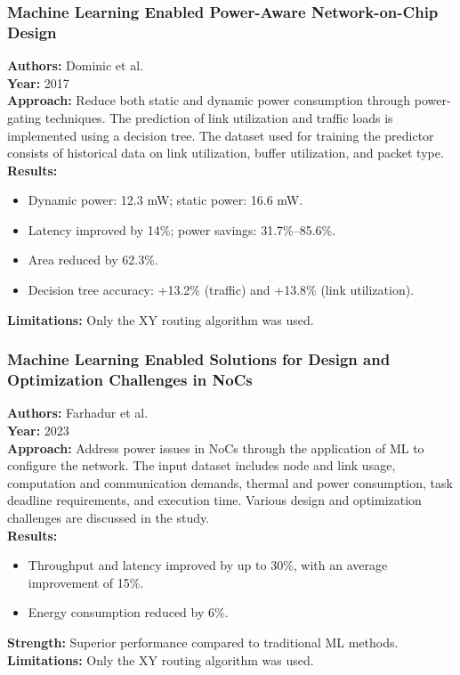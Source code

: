 \documentclass{beamer}
\begin{document}
\begin{frame}
\frametitle{Machine Learning Enabled Power-Aware Network-on-Chip Design}

\textbf{Authors:} Dominic et al. \\
\textbf{Year:} 2017 \\[10pt]

\textbf{Approach:} Reduce both static and dynamic power consumption through power-gating techniques. The prediction of link utilization and traffic loads is implemented using a decision tree. The dataset used for training the predictor consists of historical data on link utilization, buffer utilization, and packet type. \\[10pt]

\textbf{Results:}
\begin{itemize}
\item Dynamic power: 12.3 mW; static power: 16.6 mW.
\item Latency improved by 14\%; power savings: 31.7\%–85.6\%.
\item Area reduced by 62.3\%.
\item Decision tree accuracy: +13.2\% (traffic) and +13.8\% (link utilization).
\end{itemize}


\textbf{Limitations:} Only the XY routing algorithm was used.
\end{frame}

\begin{frame}
\frametitle{Machine Learning Enabled Solutions for Design and Optimization Challenges in NoCs}

\textbf{Authors:} Farhadur et al. \\
\textbf{Year:} 2023 \\[10pt]

\textbf{Approach:} Address power issues in NoCs through the application of ML to configure the network. The input dataset includes node and link usage, computation and communication demands, thermal and power consumption, task deadline requirements, and execution time. Various design and optimization challenges are discussed in the study. \\[10pt]

\textbf{Results:}
\begin{itemize}
\item Throughput and latency improved by up to 30\%, with an average improvement of 15\%.
\item Energy consumption reduced by 6\%.
\end{itemize}

\textbf{Strength:} Superior performance compared to traditional ML methods. \\[10pt]

\textbf{Limitations:} Only the XY routing algorithm was used.
\end{frame}
\end{document}
